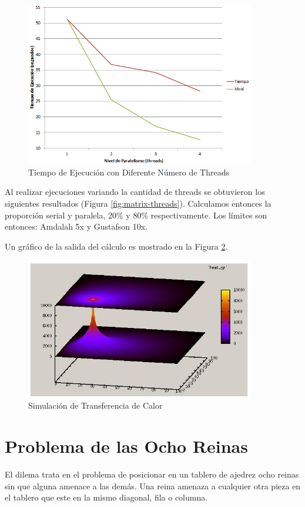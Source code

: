 \documentclass[a4paper]{report}
\begin{document}
\begin{figure}[H]
\centering
\includegraphics[width=10cm]{heat-threads.png}
\caption{Tiempo de Ejecución con Diferente Número de Threads}
\label{fig:heat-threads}
\end{figure}

Al realizar ejecuciones variando la cantidad de threads se obtuvieron los siguientes resultados (Figura \ref{fig:matrix-threads}). Calculamos entonces la proporción serial y paralela, 20\% y 80\% respectivamente. Los límites son entonces: Amdalah 5x y Gustafson 10x.

\bigskip

Un gráfico de la salida del cálculo es mostrado en la Figura \ref{fig:heat}.

\begin{figure}[H]
\centering
\includegraphics[width=10cm]{heat2d.png}
\caption{Simulación de Transferencia de Calor}
\label{fig:heat}
\end{figure}

\section{Problema de las Ocho Reinas}

El dilema trata en el problema de posicionar en un tablero de ajedrez ocho
reinas sin que alguna amenace a las demás. Una reina amenaza a cualquier otra
pieza en el tablero que este en la mismo diagonal, fila o columna.
\end{document}
